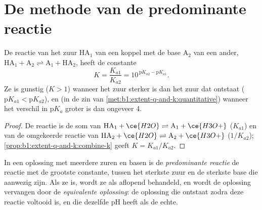 \section{De methode van de predominante reactie}

\begin{proposition}\label{prop:b1:predominant-reaction:k-of-reaction}
De reactie van het zuur $\mathrm{HA}_1$ van een koppel met de base
$\mathrm{A}_2$ van een ander,
$\mathrm{HA}_1 + \mathrm{A}_2 \rightleftharpoons \mathrm{A}_1 + \mathrm{HA}_2$,
heeft de constante
\[
  K = \frac{K_{a1}}{K_{a2}} = 10^{\,\mathrm{p}K_{a2} - \mathrm{p}K_{a1}} .
\]
Ze is gunstig ($K > 1$) wanneer het zuur sterker is dan het zuur dat
ontstaat ($\mathrm{p}K_{a1} < \mathrm{p}K_{a2}$), en  (in de
zin van \cref{met:b1:extent-q-and-k:quantitative}) wanneer het verschil
in $\mathrm{p}K_a$ groter is dan ongeveer 4.
\end{proposition}

\begin{proof}
De reactie is de som van $\mathrm{HA}_1 + \ce{H2O} \rightleftharpoons
\mathrm{A}_1 + \ce{H3O+}$ ($K_{a1}$) en van de omgekeerde reactie van
$\mathrm{HA}_2 +
\ce{H2O} \rightleftharpoons \mathrm{A}_2 + \ce{H3O+}$ ($1/K_{a2}$);
\cref{prop:b1:extent-q-and-k:combine-k} geeft $K = K_{a1}/K_{a2}$.
\end{proof}

\begin{definition}\label{def:b1:predominant-reaction:predominant-reaction}
In een oplossing met meerdere zuren en basen is de \emph{predominante
reactie} de reactie met de grootste
constante, tussen het sterkste zuur en de sterkste base die aanwezig
zijn. Als ze  is, wordt ze als aflopend behandeld, en wordt
de oplossing vervangen door de \emph{equivalente
oplossing}: de oplossing die ontstaat zodra
deze reactie voltooid is, en die dezelfde pH heeft als de echte.
\end{definition}

